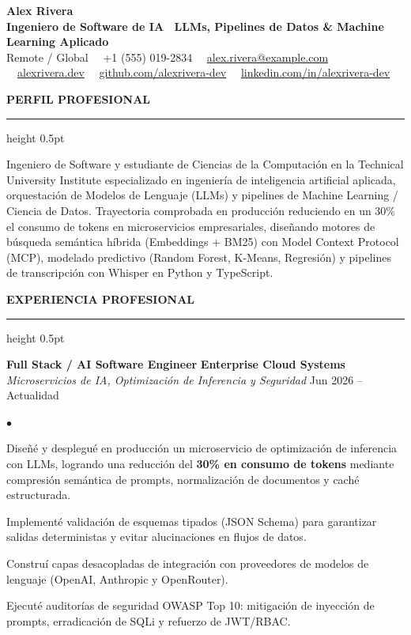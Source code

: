 \documentclass[10pt,letterpaper]{article}
\newcommand{\resumesection}[1]{%
  \vspace{2pt}%
  {\color{primary}\normalsize\bfseries\MakeUppercase{#1}}%
  \vspace{1pt}\hrule height 0.5pt\vspace{2pt}%
}
\renewenvironment{itemize}{%
  \begin{list}{\color{primary}$\bullet$}{%
    \setlength{\leftmargin}{1.1em}%
    \setlength{\itemsep}{0.5pt}%
    \setlength{\topsep}{1pt}%
    \setlength{\parsep}{0pt}%
    \setlength{\partopsep}{0pt}%
  }%
}{%
  \end{list}%
}
\begin{document}
\color{textdark}

\begin{center}
    {\LARGE \textbf{\color{primary} Alex Rivera}} \\ \vspace{1.5pt}
    {\large \textbf{Ingeniero de Software de IA \textbar\ LLMs, Pipelines de Datos \& Machine Learning Aplicado}} \\ \vspace{2pt}
    {\small
        Remote / Global \ \textbullet \
        +1 (555) 019-2834 \ \textbullet \
        \href{mailto:alex.rivera@example.com}{alex.rivera@example.com} \ \textbullet \
        \href{https://alexrivera.dev}{alexrivera.dev} \ \textbullet \
        \href{https://github.com/alexrivera-dev}{github.com/alexrivera-dev} \ \textbullet \
        \href{https://linkedin.com/in/alexrivera-dev}{linkedin.com/in/alexrivera-dev}
    }
\end{center}

\vspace{-6pt}

\resumesection{Perfil Profesional}
{\small Ingeniero de Software y estudiante de Ciencias de la Computación en la Technical University Institute especializado en ingeniería de inteligencia artificial aplicada, orquestación de Modelos de Lenguaje (LLMs) y pipelines de Machine Learning / Ciencia de Datos. Trayectoria comprobada en producción reduciendo en un 30\% el consumo de tokens en microservicios empresariales, diseñando motores de búsqueda semántica híbrida (Embeddings + BM25) con Model Context Protocol (MCP), modelado predictivo (Random Forest, K-Means, Regresión) y pipelines de transcripción con Whisper en Python y TypeScript.}

\resumesection{Experiencia Profesional}

\textbf{Full Stack / AI Software Engineer} \hfill \textbf{Enterprise Cloud Systems} \\
\textit{Microservicios de IA, Optimización de Inferencia y Seguridad} \hfill Jun 2026 -- Actualidad
\begin{itemize}
    \item Diseñé y desplegué en producción un microservicio de optimización de inferencia con LLMs, logrando una reducción del \textbf{30\% en consumo de tokens} mediante compresión semántica de prompts, normalización de documentos y caché estructurada.
    \item Implementé validación de esquemas tipados (JSON Schema) para garantizar salidas deterministas y evitar alucinaciones en flujos de datos.
    \item Construí capas desacopladas de integración con proveedores de modelos de lenguaje (OpenAI, Anthropic y OpenRouter).
    \item Ejecuté auditorías de seguridad OWASP Top 10: mitigación de inyección de prompts, erradicación de SQLi y refuerzo de JWT/RBAC.
\end{itemize}
\end{document}
